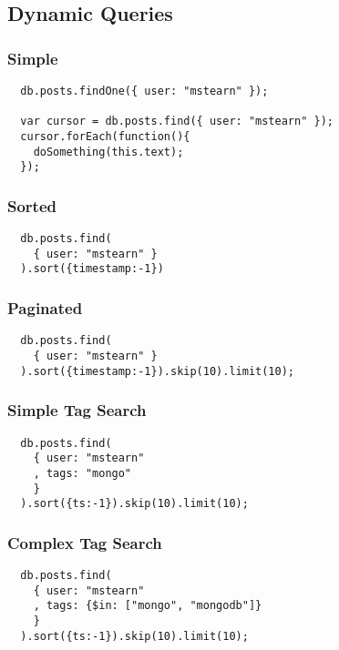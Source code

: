 \documentclass{beamer}
\begin{document}
\subsection{Dynamic Queries}

\begin{frame}[fragile]
  \frametitle{Simple}

  \begin{verbatim}
  db.posts.findOne({ user: "mstearn" });

  var cursor = db.posts.find({ user: "mstearn" });
  cursor.forEach(function(){
    doSomething(this.text);
  });
  \end{verbatim}
  
\end{frame}

\begin{frame}[fragile]
  \frametitle{Sorted}

  \begin{verbatim}
  db.posts.find(
    { user: "mstearn" }
  ).sort({timestamp:-1})
  \end{verbatim}
  
\end{frame}
\begin{frame}[fragile]
  \frametitle{Paginated}

  \begin{verbatim}
  db.posts.find(
    { user: "mstearn" }
  ).sort({timestamp:-1}).skip(10).limit(10);
  \end{verbatim}
  
\end{frame}
\begin{frame}[fragile]
  \frametitle{Simple Tag Search}

  \begin{verbatim}
  db.posts.find(
    { user: "mstearn"
    , tags: "mongo"
    }
  ).sort({ts:-1}).skip(10).limit(10);
  \end{verbatim}
  
\end{frame}

\begin{frame}[fragile]
  \frametitle{Complex Tag Search}

  \begin{verbatim}
  db.posts.find(
    { user: "mstearn"
    , tags: {$in: ["mongo", "mongodb"]}
    }
  ).sort({ts:-1}).skip(10).limit(10);
  \end{verbatim}
  
\end{frame}
\end{document}
